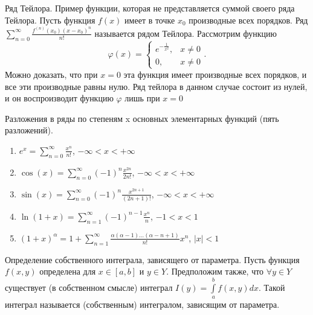 \documentclass[12pt, a4paper]{article}
\newenvironment{field}{}{\newpage}
\newif\ifnote
\newenvironment{note}{\notetrue}{\notefalse}
\begin{document}
\begin{note}
\begin{field}
Ряд Тейлора. Пример функции, которая не представляется суммой своего ряда Тейлора.
\end{field}
\begin{field}
Пусть функция $f(x)$ имеет в точке  $x_0$ производные всех порядков.
\newline
Ряд $\sum\limits_{n=0}^{\infty} \frac{f^{(n)}(x_0)(x - x_0)^n}{n!}$ называется рядом Тейлора.
\newline
Рассмотрим функцию
\[
	\varphi\left( x \right) =
	\begin{cases}
		e^{-\frac{1}{x^2}}, & x \neq  0 \\
		0, & x \neq  0
	\end{cases}
.\]
Можно доказать, что при $x = 0$ эта функция имеет производные всех порядков, и все эти производные равны нулю. Ряд тейлора в данном случае состоит из нулей, и он воспроизводит функцию  $\varphi$ лишь при $x = 0$


\end{field}
\end{note}

\begin{note}
\begin{field}
Разложения в ряды по степеням x основных элементарных функций (пять разложений).
\end{field}
\begin{field}
\begin{enumerate}
	\item $e^x = \sum\limits_{n=0}^{\infty} \frac{x^n}{n!}$, $-\infty < x < +\infty$
	\item $\cos\left( x \right) = \sum\limits_{n=0}^{\infty}(-1)^n \frac{x^{2n}}{2n!} $, $-\infty < x < +\infty$
	\item $\sin(x) = \sum\limits_{n=0}^{\infty} (-1)^n \frac{x^{2n + 1}}{(2n + 1)!}$, $-\infty < x < +\infty$
	\item $\ln\left( 1 + x \right)  = \sum\limits_{n=1}^{\infty} (-1)^{n-1} \frac{x^n}{n}$, $-1 < x < 1$
	\item  $ (1 + x)^\alpha = 1 + \sum\limits_{n=1}^{\infty} \frac{\alpha(\alpha - 1)\ldots(\alpha - n + 1)}{n!}x^n$, $ |x| < 1 $
\end{enumerate}


\end{field}
\end{note}

\begin{note}
\begin{field}
Определение собственного интеграла, зависящего от параметра.
\end{field}
\begin{field}
Пусть функция $f(x, y)$ определена для  $x \in [a, b]$ и  $y \in Y$. Предположим также, что  $\forall y \in Y$ существует (в собственном смысле) интеграл $I(y) = \int\limits_{a}^{b}f\left(x, y \right)dx$. Такой интеграл называется (собственным) интегралом, зависящим от параметра.
\end{field}
\end{note}
\end{document}

